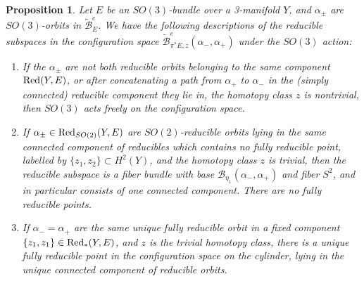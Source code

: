 \documentclass{memo-l}
\newcommand{\pE}{\pi^* \! E}
\newtheorem{proposition}[theorem]{Proposition}
\theoremstyle{definition}
\theoremstyle{remark}
\numberwithin{section}{chapter}
\numberwithin{equation}{chapter}
\begin{document}
\begin{proposition}\label{action2}Let $E$ be an $SO(3)$-bundle over a 3-manifold $Y$, and $\alpha_\pm$ are $SO(3)$-orbits in $\widetilde{\mathcal B}^e_E$. We have the following descriptions of the reducible subspaces in the configuration space $\widetilde{\mathcal B}^e_{\pE,z}(\alpha_-, \alpha_+)$ under the $SO(3)$ action: \begin{enumerate}
\item If the $\alpha_\pm$ are not both reducible orbits belonging to the same component $\textup{Red}(Y,E)$, or after concatenating a path from $\alpha_+$ to $\alpha_-$ in the (simply connected) reducible component they lie in, the homotopy class $z$ is nontrivial, then $SO(3)$ acts freely on the configuration space.

\item If $\alpha_\pm \in \textup{Red}_{SO(2)}(Y,E)$ are $SO(2)$-reducible orbits lying in the same connected component of reducibles which contains no fully reducible point, labelled by $\{z_1, z_2\} \subset H^2(Y)$, and the homotopy class $z$ is trivial, then the reducible subspace is a fiber bundle with base $\mathcal B_{\eta_1}(\alpha_-, \alpha_+)$ and fiber $S^2$, and in particular consists of one connected component. There are no fully reducible points.

\item If $\alpha_- = \alpha_+$ are the same unique fully reducible orbit in a fixed component $\{z_1, z_1\} \in \textup{Red}_*(Y,E)$, and $z$ is the trivial homotopy class, there is a unique fully reducible point in the configuration space on the cylinder, lying in the unique connected component of reducible orbits.
\end{enumerate}
\end{proposition}
\end{document}
